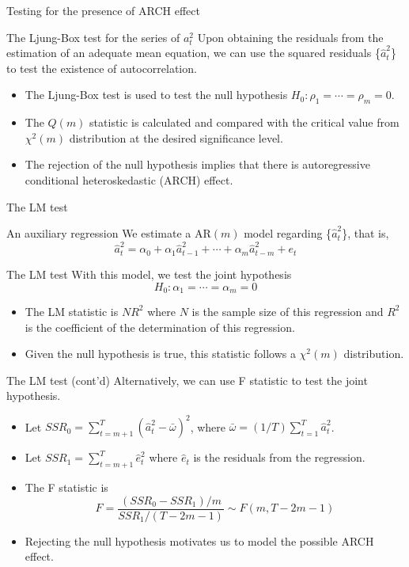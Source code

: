 \documentclass[presentation,10pt]{beamer}
\begin{document}
\begin{frame}[label={sec:orgd92c1e3}]{Testing for the presence of ARCH effect}
\begin{block}{The Ljung-Box test for the series of \(a^2_t\)}
Upon obtaining the residuals from the estimation
of an adequate mean equation, we can use the squared residuals
\{\(\hat{a}_t^2\)\} to test the existence of autocorrelation. 
\begin{itemize}
\item The Ljung-Box test is used to test the null hypothesis
\(H_0: \rho_1 = \cdots = \rho_m = 0\).
\item The \(Q(m)\) statistic is
calculated and compared with the critical value from \(\chi^2(m)\)
distribution at the desired significance level.
\item The rejection of the
null hypothesis implies that there is autoregressive conditional
heteroskedastic (ARCH) effect.
\end{itemize}
\end{block}
\end{frame}

\begin{frame}[label={sec:org3522f9f}]{The LM test}
\begin{block}{An auxiliary regression}
We estimate a AR\((m)\) model regarding \{\(\hat{a}^2_t\)\}, that is,
\[ \hat{a}^2_t = \alpha_0 + \alpha_1 \hat{a}_{t-1}^2 + \cdots +
\alpha_m \hat{a}^2_{t-m} + e_t \]
\end{block}

\begin{block}{The LM test}
With this model, we test the joint hypothesis
\[H_0: \alpha_1 = \cdots = \alpha_m = 0 \]
\begin{itemize}
\item The LM statistic is \(NR^2\) where \(N\) is the sample size of this
regression and \(R^2\) is the coefficient of the determination of this
regression.
\item Given the null hypothesis is true, this statistic follows
a \(\chi^2(m)\) distribution.
\end{itemize}
\end{block}
\end{frame}

\begin{frame}[label={sec:org538d51b}]{The LM test (cont'd)}
Alternatively, we can use F statistic to test the joint
hypothesis. 
\begin{itemize}
\item Let \(SSR_0 = \sum_{t=m+1}^{T} (\hat{a}^2_{t} -
  \bar{\omega})^2\), where \(\bar{\omega} = (1/T) \sum_{t=1}^T
  \hat{a}^2_t\).
\item Let \(SSR_1 = \sum_{t=m+1}^T \hat{e}^2_t\) where \(\hat{e}_t\) is the
residuals from the regression.
\item The F statistic is
\[F = \frac{(SSR_0 - SSR_1)/m}{SSR_1/(T-2m-1)} \sim F(m, T-2m-1)\]
\item Rejecting the null hypothesis motivates us to model the possible
ARCH effect.
\end{itemize}
\end{frame}
\end{document}
